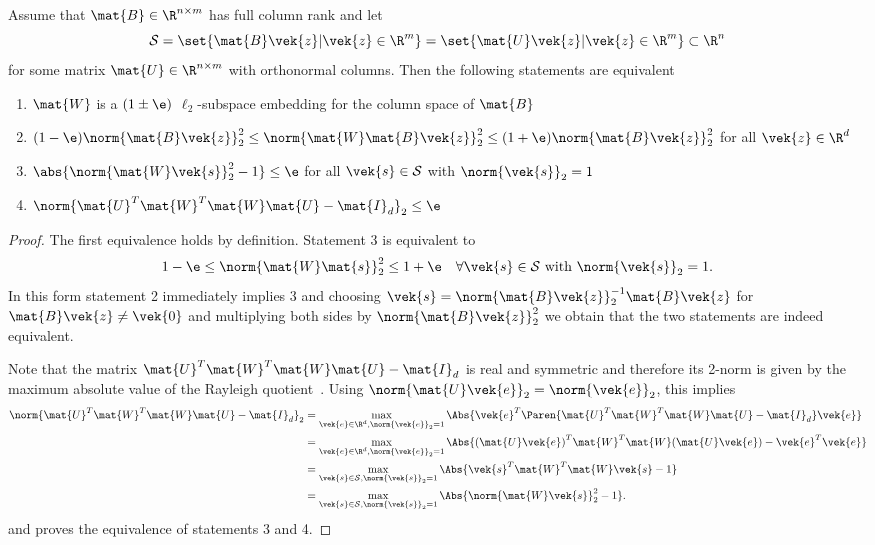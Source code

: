 \begin{theorem}
Assume that \(\mat{B} \in \R^{n \times m}\) has full column rank and let
\[\mathcal{S} = \set{ \mat{B}\vek{z} | \vek{z} \in \R^m } = \set{ \mat{U}\vek{z} | \vek{z} \in \R^m } \subset \R^n\]
for some matrix \(\mat{U} \in \R^{n \times m}\) with orthonormal columns.
Then the following statements are equivalent
\begin{enumerate}
  \item \(\mat{W}\) is a \((1\pm\e)\) \(\ell_2\)-subspace embedding for the column space of \(\mat{B}\)
  \item \((1-\e) \norm{\mat{B}\vek{z}}_2^2 \leq \norm{\mat{W}\mat{B}\vek{z}}_2^2 \leq (1+\e)\norm{\mat{B}\vek{z}}_2^2\) for all \(\vek{z} \in \R^d\)
  \item \(\abs{\norm{\mat{W}\vek{s}}_2^2 - 1} \leq \e\) for all \(\vek{s} \in \mathcal{S}\) with \(\norm{\vek{s}}_2 = 1\)
  \item \(\norm{\mat{U}^T \mat{W}^T \mat{W} \mat{U} - \mat{I}_d}_2 \leq \e\)
\end{enumerate}
\end{theorem}
\begin{proof}
The first equivalence holds by definition. Statement 3 is equivalent to
\[ 1-\e \leq \norm{\mat{W}\mat{s}}_2^2 \leq 1+\e \quad \forall \vek{s} \in \mathcal{S} \text{ with } \norm{\vek{s}}_2 = 1. \]
In this form statement 2 immediately implies 3 and choosing \(\vek{s} = \norm{\mat{B}\vek{z}}_2^{-1} \mat{B}\vek{z}\) for \(\mat{B}\vek{z} \neq \vek{0}\) and multiplying both sides by \(\norm{\mat{B}\vek{z}}_2^2\) we obtain that the two statements are indeed equivalent.

Note that the matrix \(\mat{U}^T \mat{W}^T \mat{W} \mat{U} - \mat{I}_d\) is real and symmetric and therefore its 2-norm is given by the maximum absolute value of the Rayleigh quotient~\cite[Equation (5.2)]{Demmel-AppliedNumericalLinearAlgebra}.
Using \(\norm{\mat{U}\vek{e}}_2 = \norm{\vek{e}}_2\), this implies
\begin{align*}
  \norm{\mat{U}^T \mat{W}^T \mat{W} \mat{U} - \mat{I}_d}_2
  &= \max_{\vek{e} \in \R^d, \norm{\vek{e}}_2 = 1} \Abs{\vek{e}^T \Paren{\mat{U}^T \mat{W}^T \mat{W} \mat{U} - \mat{I}_d} \vek{e} } \\
  &= \max_{\vek{e} \in \R^d, \norm{\vek{e}}_2 = 1} \Abs{{(\mat{U}\vek{e})}^T \mat{W}^T \mat{W} (\mat{U}\vek{e}) - \vek{e}^T \vek{e}} \\
  &= \max_{\vek{s} \in \mathcal{S}, \norm{\vek{s}}_2 = 1} \Abs{\vek{s}^T \mat{W}^T \mat{W} \vek{s} - 1} \\
  &= \max_{\vek{s} \in \mathcal{S}, \norm{\vek{s}}_2 = 1} \Abs{\norm{\mat{W}\vek{s}}_2^2 - 1}.
\end{align*}
and proves the equivalence of statements 3 and 4.
\end{proof}

